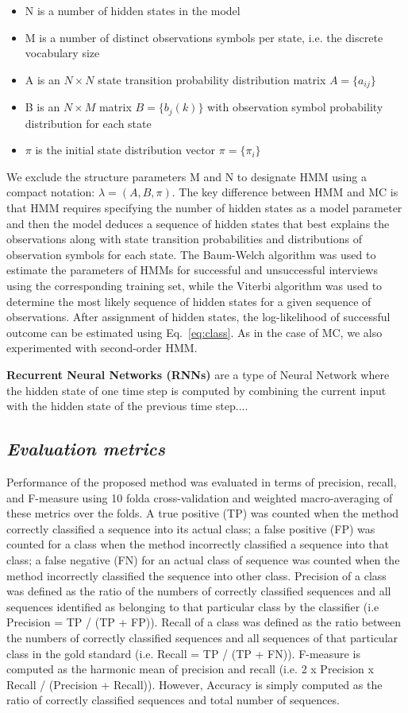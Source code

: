 \documentclass{amia_summit_2018}
\begin{document}
\begin{itemize}
\item N is a number of hidden states in the model
\item M is a number of distinct observations symbols per state, i.e. the discrete vocabulary size
\item A is an $N\times N$ state transition probability distribution matrix $A = \{a_{ij}\}$
\item B is an $N\times M$ matrix $B = \{b_j(k)\}$ with observation symbol probability distribution for each state 
\item $\pi$ is the initial state distribution vector $\pi = \{\pi_i\}$
\end{itemize}

We exclude the structure parameters M and N to designate HMM using a compact notation: $\lambda = (A, B, \pi)$. The key difference between HMM and MC is that HMM requires specifying the number of hidden states as a model parameter and then the model deduces a sequence of hidden states that best explains the observations along with state transition probabilities and distributions of observation symbols for each state. The Baum-Welch algorithm was used to estimate the parameters of HMMs for successful and unsuccessful interviews using the corresponding training set, while the Viterbi algorithm was used to determine the most likely sequence of hidden states for a given sequence of observations. After assignment of hidden states, the log-likelihood of successful outcome can be estimated using Eq.~\ref{eq:class}. As in the case of MC, we also experimented with second-order HMM.

\textbf {Recurrent Neural Networks (RNNs)} are a type of Neural Network where the hidden state of one time step is computed by combining the current input with the hidden state of the previous time step....   

\subsection*{\textit{Evaluation metrics}}
Performance of the proposed method was evaluated in terms of precision, recall, and F-measure using 10 folda cross-validation and weighted macro-averaging of these metrics over the folds. A true positive (TP) was counted when the method correctly classified a sequence into its actual class; a false positive (FP) was counted for a class when the method incorrectly classified a sequence into that class; a false negative (FN) for an actual class of sequence was counted when the method incorrectly classified the sequence into other class. Precision of a class was defined as the ratio of the numbers of correctly classified sequences and all sequences identified as belonging to that particular class by the classifier (i.e Precision = TP / (TP + FP)). Recall of a class was defined as the ratio between the numbers of correctly classified sequences and all sequences of that particular class in the gold standard (i.e. Recall = TP / (TP + FN)). F-measure is computed as the harmonic mean of precision and recall (i.e. 2 x Precision x Recall / (Precision + Recall)). However, Accuracy is simply computed as the ratio of correctly classified sequences and total number of sequences.   
\end{document}
